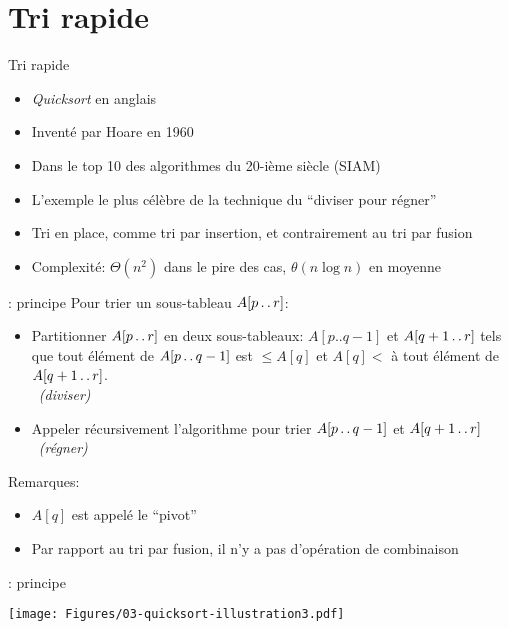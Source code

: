 \section{Tri rapide}

\begin{frame}{Tri rapide}
\begin{itemize}
\item {\em Quicksort} en anglais
\item Inventé par Hoare en 1960
\item Dans le top 10 des algorithmes du 20-ième siècle (SIAM)
\item L'exemple le plus célèbre de la technique du ``diviser pour régner''
\item Tri en place, comme tri par insertion, et contrairement au tri par fusion
\item Complexité: $\Theta(n^2)$ dans le pire des cas, $\theta(n\log n)$ en moyenne
\end{itemize}
\end{frame}

\begin{frame}{: principe}
Pour trier un sous-tableau $A[p\mathinner{\ldotp\ldotp} r]$:
\begin{itemize}
\item Partitionner $A[p\mathinner{\ldotp\ldotp} r]$ en deux sous-tableaux: $A[p..q-1]$ et $A[q+1\mathinner{\ldotp\ldotp} r]$ tels que tout élément de $A[p\mathinner{\ldotp\ldotp} q-1]$ est $\leq A[q]$ et $A[q]<$ à tout élément de $A[q+1\mathinner{\ldotp\ldotp} r]$.\\~\hfill\alert{\emph{(diviser)}}

\item Appeler récursivement l'algorithme pour trier $A[p\mathinner{\ldotp\ldotp} q-1]$ et $A[q+1\mathinner{\ldotp\ldotp} r]$\\~\hfill\alert{\emph{(régner)}}
\end{itemize}

\bigskip

Remarques:
\begin{itemize}
\item $A[q]$ est appelé le ``\alert{pivot}''
\item Par rapport au tri par fusion, il n'y a pas d'opération de combinaison
\end{itemize}

\end{frame}

\begin{frame}{: principe}

\centerline{\texttt{[image: Figures/03-quicksort-illustration3.pdf]}}


\end{frame}

